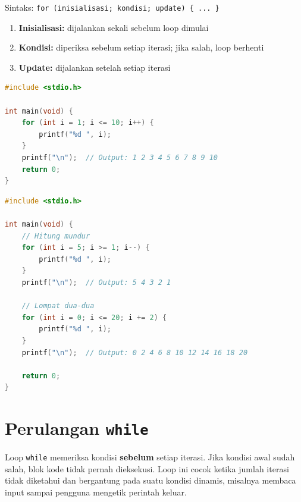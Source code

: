 \documentclass[../main.tex]{subfiles}
\begin{document}
\begin{konsep}
Sintaks: \texttt{for (inisialisasi; kondisi; update) \{ ... \}}
\begin{enumerate}[nosep]
  \item \textbf{Inisialisasi:} dijalankan sekali sebelum loop dimulai
  \item \textbf{Kondisi:} diperiksa sebelum setiap iterasi; jika salah, loop berhenti
  \item \textbf{Update:} dijalankan setelah setiap iterasi
\end{enumerate}
\end{konsep}

\begin{lstlisting}[language=C,caption=Mencetak bilangan 1 sampai 10]
#include <stdio.h>

int main(void) {
    for (int i = 1; i <= 10; i++) {
        printf("%d ", i);
    }
    printf("\n");  // Output: 1 2 3 4 5 6 7 8 9 10
    return 0;
}
\end{lstlisting}

\begin{lstlisting}[language=C,caption=Variasi loop \texttt{for}]
#include <stdio.h>

int main(void) {
    // Hitung mundur
    for (int i = 5; i >= 1; i--) {
        printf("%d ", i);
    }
    printf("\n");  // Output: 5 4 3 2 1
    
    // Lompat dua-dua
    for (int i = 0; i <= 20; i += 2) {
        printf("%d ", i);
    }
    printf("\n");  // Output: 0 2 4 6 8 10 12 14 16 18 20
    
    return 0;
}
\end{lstlisting}



\section{Perulangan \texttt{while}}

Loop \texttt{while} memeriksa kondisi \textbf{sebelum} setiap iterasi. Jika kondisi awal sudah salah, blok kode tidak pernah dieksekusi. Loop ini cocok ketika jumlah iterasi tidak diketahui dan bergantung pada suatu kondisi dinamis, misalnya membaca input sampai pengguna mengetik perintah keluar.
\end{document}

